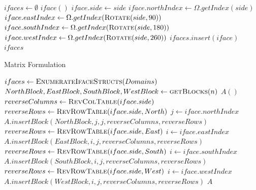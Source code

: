 \documentclass[12pt]{article}
\begin{document}
\begin{algorithm}[H]
\caption{}
\begin{algorithmic}[1]
    \State $ifaces \gets \emptyset$ 
                \State $iface()$ 
                \State $iface.side \gets side$
                \State $iface.northIndex \gets \Omega.getIndex(side)$
                \State $iface.eastIndex \gets \Omega.getIndex(\Call{Rotate}{side,90})$
                \State $iface.southIndex \gets \Omega.getIndex(\Call{Rotate}{side,180})$
                \State $iface.westIndex \gets \Omega.getIndex(\Call{Rotate}{side,260})$
                \State $ifaces.insert(iface)$
            \EndIf
        \EndFor
    \EndFor
    \State \Return $ifaces$
    \EndProcedure
\end{algorithmic}
    \label{ifaces}
\end{algorithm}
\begin{algorithm}[H]
\caption{Matrix Formulation}
\begin{algorithmic}[1]
    \State $ifaces \gets \Call{EnumerateIfaceStructs}{Domains}$
    \State $NorthBlock, EastBlock, SouthBlock, WestBlock \gets \Call{getBlocks}{n}$
    \State $A()$ 
     
        \State
        \State $reverseColumns \gets \Call{RevColTable}{iface.side}$
        \State $reverseRows \gets \Call{RevRowTable}{iface.side,North}$
        \State $j \gets iface.northIndex$
        \State $A.insertBlock(NorthBlock,j,j,reverseColumns,reverseRows)$
        \State
            \State $reverseRows \gets \Call{RevRowTable}{iface.side,East}$
            \State $i \gets iface.eastIndex$
            \State $A.insertBlock(EastBlock,i,j,reverseColumns,reverseRows)$
        \EndIf
        \State
            \State $reverseRows \gets \Call{RevRowTable}{iface.side,South}$
            \State $i \gets iface.southIndex$
            \State $A.insertBlock(SouthBlock,i,j,reverseColumns,reverseRows)$
        \EndIf
        \State
            \State $reverseRows \gets \Call{RevRowTable}{iface.side,West}$
            \State $i \gets iface.westIndex$
            \State $A.insertBlock(WestBlock,i,j,reverseColumns,reverseRows)$
        \EndIf
        \State
    \EndFor
    \State \Return $A$
    \EndProcedure
\end{algorithmic}
\end{algorithm}
\end{document}
